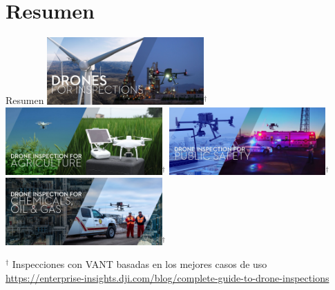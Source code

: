 \documentclass[
  24pt, %
  aspectratio=169, %
]{beamer}
\begin{document}
\section{Resumen}
\begin{frame}{Resumen}%
  \bigskip %
  \centering
  \includegraphics[width=0.45\textwidth,height=0.35\textheight]{DJI_B1}$^\dag$
  \hfil
  \includegraphics[width=0.45\textwidth,height=0.35\textheight]{DJI_B2}$^\dag$
  \vspace{2pt}
  \includegraphics[width=0.45\textwidth,height=0.35\textheight]{DJI_B5}$^\dag$ 
  \hfil
  \includegraphics[width=0.45\textwidth,height=0.35\textheight]{DJI_B4}$^\dag$\\
  \rule{0in}{1.2em}$^\dag$ \small Inspecciones con VANT basadas en los mejores casos de uso\\
  \tiny \url{https://enterprise-insights.dji.com/blog/complete-guide-to-drone-inspections}
\end{frame}
\end{document}
